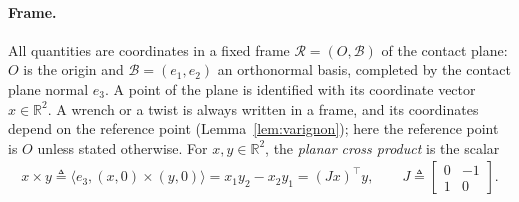 \documentclass[11pt,a4paper]{article}
\theoremstyle{plain}
\newcommand{\R}{\mathbb{R}}
\begin{document}
\paragraph{Frame.}
All quantities are coordinates in a fixed frame $\mathcal R=(O,\mathcal B)$ of the contact plane: $O$ is the origin and $\mathcal B=(e_1,e_2)$ an orthonormal basis, completed by the contact plane normal
$e_3$. A point of the plane is identified with its coordinate vector $x\in\R^2$. A wrench or a twist is always written in a frame, and its coordinates depend on the reference point
(Lemma~\ref{lem:varignon}); here the reference point is $O$ unless stated otherwise. For $x,y\in\R^2$, the \textit{planar cross product} is the scalar
\begin{align}
    x\times y \triangleq \langle e_3,(x,0)\times(y,0)\rangle = x_1y_2-x_2y_1 = (Jx)^\top y,
    \qquad
    J \triangleq
    \begin{bmatrix}
    0&-1\\
    1&0
    \end{bmatrix}.
\end{align}
\end{document}
